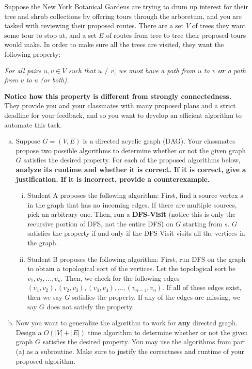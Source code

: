 \documentclass[11pt]{article}
\begin{document}
    \newpage
    \begin{tcolorbox}[title={Problem 3  (Helping Botanical Garden, 40 pts)}]

    Suppose the New York Botanical Gardens are trying to drum up interest for their tree and shrub collections by offering tours through the arboretum, and you are tasked with reviewing their proposed routes. There are a set $V$ of trees they want some tour to stop at, and a set $E$ of routes from tree to tree their proposed tours would make. In order to make sure all the trees are visited, they want the following property:

    \begin{center}
        \textit{For all pairs $u, v \in V$ such that $u \neq v$, we must have a path from $u$ to $v$ \textbf{or} a path from $v$ to $u$ (or both).}
    \end{center}

    \textbf{Notice how this property is different from strongly connectedness.} They provide you and your classmates with many proposed plans and a strict deadline for your feedback, and so you want to develop an efficient algorithm to automate this task.

    \begin{enumerate}[(a)]
        \item Suppose $G = (V, E)$ is a directed acyclic graph (DAG). Your classmates propose two possible algorithms to determine whether or not the given graph $G$ satisfies the desired property. For each of the proposed algorithms below, \textbf{analyze its runtime and whether it is correct. If it is correct, give a justification. If it is incorrect, provide a counterexample.}
        \begin{enumerate}[(i)]
            \item Student A proposes the following algorithm: First, find a source vertex $s$ in the graph that has no incoming edges. If there are multiple sources, pick an arbitrary one. Then, run a \textbf{DFS-Visit} (notice this is only the recursive portion of DFS, not the entire DFS) on $G$ starting from $s$. $G$ satisfies the property if and only if the DFS-Visit visits all the vertices in the graph.
            \item Student B proposes the following algorithm: First, run DFS on the graph to obtain a topological sort of the vertices. Let the topological sort be $v_1, v_2,\dots, v_n$. Then, we check for the following edges $(v_1, v_2), (v_2, v_3), (v_3, v_4), \dots, (v_{n-1}, v_n)$. If all of these edges exist, then we say $G$ satisfies the property. If any of the edges are missing, we say $G$ does not satisfy the property.
        \end{enumerate}
        \item Now you want to generalize the algorithm to work for \textbf{any} directed graph. Design a $O(|V|+|E|)$ time algorithm to determine whether or not the given graph $G$ satisfies the desired property. You may use the algorithms from part (a) as a subroutine.  Make sure to justify the correctness and runtime of your proposed algorithm.
    \end{enumerate}
    \end{tcolorbox}
    
    
\end{document}
